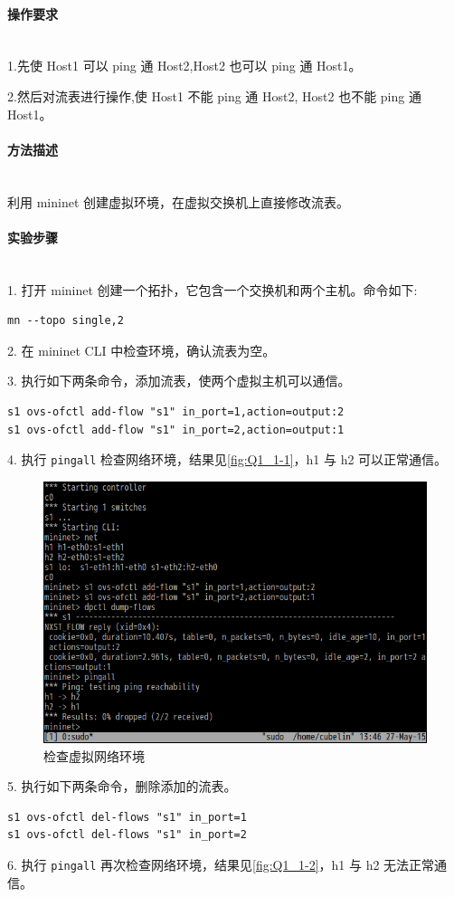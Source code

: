\documentclass[format=draft,language=chinese,category=SDN]{hustreport}
\newcommand{\myparagraph}[1]{\paragraph{#1}\mbox{}\\}
\newcommand{\code}{\texttt}
\begin{document}
\myparagraph{操作要求}

1.先使 Host1 可以 ping 通 Host2,Host2 也可以 ping 通 Host1。

2.然后对流表进行操作,使 Host1 不能 ping 通 Host2, Host2 也不能 ping 通 Host1。

\myparagraph{方法描述}

利用 mininet 创建虚拟环境，在虚拟交换机上直接修改流表。

\myparagraph{实验步骤}

1. 打开 mininet 创建一个拓扑，它包含一个交换机和两个主机。命令如下:

\begin{lstlisting}
mn --topo single,2
\end{lstlisting}

2. 在 mininet CLI 中检查环境，确认流表为空。

3. 执行如下两条命令，添加流表，使两个虚拟主机可以通信。

\begin{lstlisting}
s1 ovs-ofctl add-flow "s1" in_port=1,action=output:2
s1 ovs-ofctl add-flow "s1" in_port=2,action=output:1
\end{lstlisting}

4. 执行 \code{pingall} 检查网络环境，结果见\autoref{fig:Q1_1-1}，h1 与 h2 可以正常通信。

\begin{figure}[!h]
\centering
\includegraphics[width=.618\textwidth]{fig/1_1-1.png}
\caption{检查虚拟网络环境}\label{fig:Q1_1-1}
\end{figure}

5. 执行如下两条命令，删除添加的流表。

\begin{lstlisting}
s1 ovs-ofctl del-flows "s1" in_port=1
s1 ovs-ofctl del-flows "s1" in_port=2
\end{lstlisting}

6. 执行 \code{pingall} 再次检查网络环境，结果见\autoref{fig:Q1_1-2}，h1 与 h2 无法正常通信。
\end{document}
